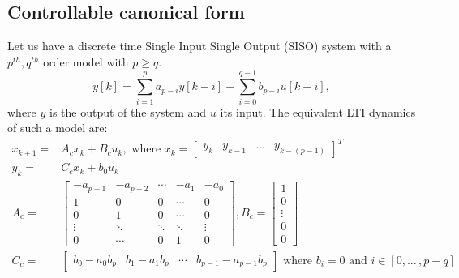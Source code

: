 \documentclass[sigconf]{llncs}
\newcommand{\mat}[1]{{#1}}
\renewcommand{\vec}[1]{{#1}}
\begin{document}
\subsection{Controllable canonical form} \label{sec:reachable}

Let us have a discrete time Single Input Single Output (SISO) system with a $p^{th},q^{th}$ order model with $p\geq q$.
$$y[k]=\sum_{i=1}^p a_{p-i}y[k-i]+\sum_{i=0}^{q-1} b_{p-i}u[k-i],$$
where $y$ is the output of the system and $u$ its input.
The equivalent LTI dynamics of such a model are:
\begin{align}
\label{eq:cf_SISO}
\vec{x}_{k+1}=&\mat{A}_c\vec{x}_k+\mat{B}_cu_k, \text{ where } \vec{x}_k=[\begin{array}{cccc}y_k&y_{k-1}&\hdots&y_{k-(p-1)}\end{array}]^T\\
y_k=&\mat{C}_c\vec{x}_k + b_0u_k\nonumber\\
\mat{A}_c=&\left[
\begin{array}{ccccc}
-a_{p-1}&-a_{p-2}&\cdots&-a_1&-a_0\\
1&0&0&\cdots&0\\
0&1&0&\cdots&0\\
\vdots&\ddots&\ddots&\ddots&\vdots\\
0&\cdots&0&1&0
\end{array}\right],
\mat{B}_c=\left[
\begin{array}{c}
1\\0\\ \vdots\\ 0\\ 0
\end{array}\right]\nonumber\\
\mat{C}_c=&[\begin{array}{ccccc}b_0-a_0b_p&b_1-a_1b_p&\cdots&b_{p-1}-a_{p-1}b_p\end{array}] \text{ where } b_i=0 \text{ and } i \in [0, ...\,,p-q]\nonumber
\end{align}
\end{document}
